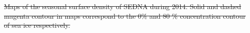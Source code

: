 \documentclass[lineno,sn-basic]{sn-jnl}%
\providecommand{\DIFdel}[1]{{\protect\color{red}\sout{#1}}}                      %
\providecommand{\DIFaddbegin}{} %
\providecommand{\DIFaddend}{} %
\providecommand{\DIFdelbegin}{} %
\providecommand{\DIFdelend}{} %
\providecommand{\DIFdelFL}[1]{\DIFdel{#1}} %
\newcommand{\DIFscaledelfig}{0.5}
\newlength{\DIFdelgraphicswidth} %
\newlength{\DIFdelgraphicsheight} %
\newcommand{\DIFaddincludegraphics}[2][]{{\color{blue}\fbox{\DIFOincludegraphics[#1]{#2}}}} %
\newcommand{\DIFdelincludegraphics}[2][]{%
\sbox{\DIFdelgraphicsbox}{\DIFOincludegraphics[#1]{#2}}%
\settoboxwidth{\DIFdelgraphicswidth}{\DIFdelgraphicsbox} %
\settoboxtotalheight{\DIFdelgraphicsheight}{\DIFdelgraphicsbox} %
\scalebox{\DIFscaledelfig}{%
\parbox[b]{\DIFdelgraphicswidth}{\usebox{\DIFdelgraphicsbox}\\[-\baselineskip] \rule{\DIFdelgraphicswidth}{0em}}\llap{\resizebox{\DIFdelgraphicswidth}{\DIFdelgraphicsheight}{%
\setlength{\unitlength}{\DIFdelgraphicswidth}%
\begin{picture}(1,1)%
\thicklines\linethickness{2pt} %
{\color[rgb]{1,0,0}\put(0,0){\framebox(1,1){}}}%
{\color[rgb]{1,0,0}\put(0,0){\line( 1,1){1}}}%
{\color[rgb]{1,0,0}\put(0,1){\line(1,-1){1}}}%
\end{picture}%
}\hspace*{3pt}}} %
} %
\DeclareRobustCommand{\DIFaddbegin}{\DIFOaddbegin \let\includegraphics\DIFaddincludegraphics} %
\DeclareRobustCommand{\DIFaddend}{\DIFOaddend \let\includegraphics\DIFOincludegraphics} %
\DeclareRobustCommand{\DIFdelbegin}{\DIFOdelbegin \let\includegraphics\DIFdelincludegraphics} %
\DeclareRobustCommand{\DIFdelend}{\DIFOaddend \let\includegraphics\DIFOincludegraphics} %
\begin{document}
\begin{appendices}
\DIFdelbegin %
{%
\DIFdelFL{Maps of the seasonal surface density of SEDNA during 2014. Solid and dashed magenta contour in maps correspond to the 0\% and 80 \% concentration contour of sea ice respectively.}}
\DIFdelend %
\DIFaddbegin 


\DIFaddend 

\end{appendices}
\end{document}

